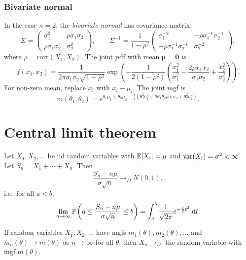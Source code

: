 \documentclass[a4paper]{article}
\begin{document}
\subsubsection*{Bivariate normal}
In the case $n = 2$, the \emph{bivariate normal} has covariance matrix
\[
  \Sigma=
  \begin{pmatrix}
    \sigma_1^2 & \rho\sigma_1\sigma_2\\
    \rho\sigma_1\sigma_2 & \sigma_2^2
  \end{pmatrix},
  \qquad
  \Sigma^{-1} = \frac{1}{1 - \rho^2}
  \begin{pmatrix}
    \sigma_1^{-2} & -\rho\sigma_1^{-1}\sigma_2^{-1}\\
    -\rho\sigma_1^{-1}\sigma_2^{-1} & \sigma_2^{-2}
  \end{pmatrix},
\]
where $\rho = \mathrm{corr}(X_1, X_2)$. The joint pdf with mean $\boldsymbol\mu = \mathbf{0}$ is
\[
  f(x_1, x_2) = \frac{1}{2\pi \sigma_1 \sigma_2 \sqrt{1 - \rho^2}} \exp\left(-\frac{1}{2(1 - \rho^2)}\left(\frac{x_1^2}{\sigma_1^2} - \frac{2\rho x_1x_2}{\sigma_1\sigma_2} + \frac{x_2^2}{\sigma_2^2}\right)\right).
\]
For non-zero mean, replace $x_i$ with $x_i - \mu_i$. The joint mgf is
\[
  m(\theta_1, \theta_2) = e^{\theta_1\mu_1 + \theta_2 \mu_2 + \frac{1}{2}(\theta_1^2\sigma_1^2 + 2\theta_1\theta_2\rho\sigma_1\sigma_2 + \theta_2^2\sigma_2^2)}.
\]

\section{Central limit theorem}
\begin{thm}
  Let $X_1, X_2, \dotsc$ be iid random variables with $\mathbb{E}[X_i] = \mu$ and $\operatorname{var}(X_i) = \sigma^2 < \infty$. Let $S_n = X_1 + \dotsb + X_n$. Then
  \[
    \frac{S_n - n\mu}{\sigma\sqrt{n}} \to_{D} N(0, 1),
  \]
  i.e.\ for all $a < b$,
  \[
    \lim_{n \to \infty}\mathbb{P}\left(a \leq \frac{S_{n} - n\mu}{\sigma\sqrt{n}} \leq b\right) = \int_a^b \frac{1}{\sqrt{2\pi}} e^{-\frac{1}{2}t^2}\;\mathrm{d} t.
  \]
\end{thm}

\begin{thm}
  If random variables $X_1, X_2, \dotsc$ have mgfs $m_1(\theta), m_2(\theta), \dotsc$ and $m_n(\theta) \to m(\theta)$ as $n\to\infty$ for all $\theta$, then $X_n \to_D$ the random variable with mgf $m(\theta)$.
\end{thm}
\end{document}
